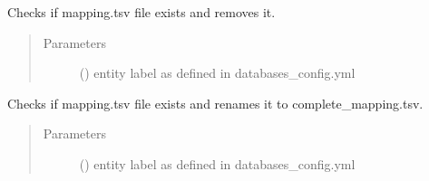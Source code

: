 \documentclass[letterpaper,10pt,english]{sphinxmanual}
\begin{document}
\begin{fulllineitems}
\label{\detokenize{_autosummary/graphdb_builder:graphdb_builder.mapping.reset_mapping}}
Checks if mapping.tsv file exists and removes it.
\begin{quote}\begin{description}
\item[{Parameters}] \leavevmode
{} () \textendash{} entity label as defined in databases\_config.yml

\end{description}\end{quote}

\end{fulllineitems}


\begin{fulllineitems}
\label{\detokenize{_autosummary/graphdb_builder:graphdb_builder.mapping.mark_complete_mapping}}
Checks if mapping.tsv file exists and renames it to complete\_mapping.tsv.
\begin{quote}\begin{description}
\item[{Parameters}] \leavevmode
{} () \textendash{} entity label as defined in databases\_config.yml

\end{description}\end{quote}

\end{fulllineitems}

\end{document}
